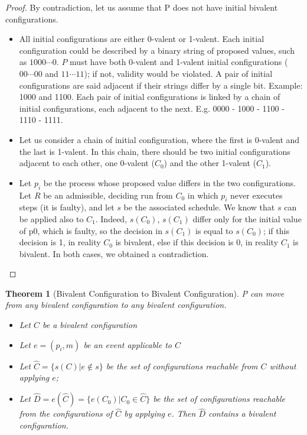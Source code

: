 \documentclass[a4paper,11pt,hidelinks]{article}
\newtheorem{theorem}{Theorem}
\begin{document}
\begin{proof}
    By contradiction, let us assume that P does not have initial bivalent configurations.

    \begin{itemize}
        \item All initial configurations are either 0-valent or 1-valent. Each initial configuration could be described by a binary string of proposed values, such as $1000 \cdots 0$. $P$ must have both 0-valent and 1-valent initial configurations ($00 \cdots 00$ and $11 \cdots 11$); if not, validity would be violated. A pair of initial configurations are said adjacent if their strings differ by a single bit. Example: 1000 and 1100. Each pair of initial configurations is linked by a chain of initial configurations, each adjacent to the next. E.g. 0000 - 1000 - 1100 - 1110 - 1111.
        \item Let us consider a chain of initial configuration, where the first is 0-valent and the last is 1-valent. In this chain, there should be two initial configurations adjacent to each other, one 0-valent ($C_0$) and the other 1-valent ($C_1$).
        \item Let $p_i$ be the process whose proposed value differs in the two configurations. Let $R$ be an admissible, deciding run from $C_0$ in which $p_i$ never executes steps (it is faulty), and let $s$ be the associated schedule. We know that $s$ can be applied also to $C_1$. Indeed, $s(C_0)$, $s(C_1)$ differ only for the initial value of p0, which is faulty, so the decision in $s(C_1)$ is equal to $s(C_0)$; if this decision is 1, in reality $C_0$ is bivalent, else if this decision is 0, in reality $C_1$ is bivalent. In both cases, we obtained a contradiction.
    \end{itemize}
\end{proof}

\begin{theorem}[Bivalent Configuration to Bivalent Configuration]
    P can move from any bivalent configuration to any bivalent configuration.
    \begin{itemize}
        \item Let $C$ be a bivalent configuration
        \item Let $e = (p_i, m)$ be an event applicable to $C$
        \item Let $\hat{C} = \{s(C) | e \notin s\}$ be the set of configurations reachable from $C$ without applying $e$;
        \item Let $\hat{D} = e(\hat{C}) = \{e(C_0) | C_0 \in \hat{C}\}$ be the set of configurations reachable from the configurations of $\hat{C}$ by applying $e$. Then $\hat{D}$ contains a bivalent configuration.
    \end{itemize}
\end{theorem}
\end{document}
